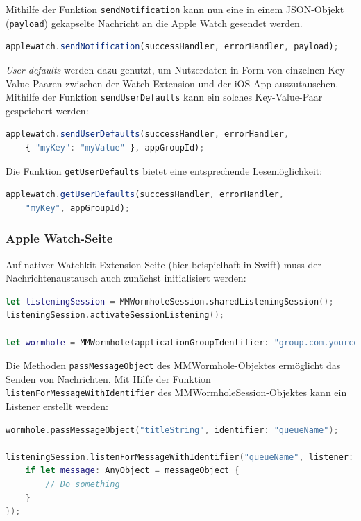 Mithilfe der Funktion \texttt{sendNotification} kann nun eine in einem JSON-Objekt (\texttt{payload}) gekapselte Nachricht an die Apple Watch gesendet werden.  
\begin{lstlisting}[language=JavaScript]
applewatch.sendNotification(successHandler, errorHandler, payload);
\end{lstlisting}

\emph{User defaults} werden dazu genutzt, um Nutzerdaten in Form von einzelnen Key-Value-Paaren zwischen der Watch-Extension und der iOS-App auszutauschen. Mithilfe der Funktion \texttt{sendUserDefaults} kann ein solches Key-Value-Paar gespeichert werden:
\begin{lstlisting}[language=JavaScript, breaklines=true]
applewatch.sendUserDefaults(successHandler, errorHandler, 
    { "myKey": "myValue" }, appGroupId);
\end{lstlisting}
Die Funktion \texttt{getUserDefaults} bietet eine entsprechende Lesemöglichkeit:
\begin{lstlisting}[language=JavaScript]
applewatch.getUserDefaults(successHandler, errorHandler, 
    "myKey", appGroupId);
\end{lstlisting}
%
%
\subsubsection{Apple Watch-Seite}
Auf nativer Watchkit Extension Seite (hier beispielhaft in Swift) muss der Nachrichtenaustausch auch zunächst initialisiert werden:
\begin{lstlisting}[language=swift, breaklines=true]
let listeningSession = MMWormholeSession.sharedListeningSession();
listeningSession.activateSessionListening();

let wormhole = MMWormhole(applicationGroupIdentifier: "group.com.yourcompany", optionalDirectory: nil, transitingType: .SessionContext);
\end{lstlisting}

Die Methoden \texttt{passMessageObject} des MMWormhole-Objektes ermöglicht das Senden von Nachrichten. Mit Hilfe der Funktion \texttt{listenForMessageWithIdentifier} des MMWormholeSession-Objektes kann ein Listener erstellt werden:
\begin{lstlisting}[language=swift, breaklines=true]
wormhole.passMessageObject("titleString", identifier: "queueName");

listeningSession.listenForMessageWithIdentifier("queueName", listener: { (messageObject) -> Void in
    if let message: AnyObject = messageObject {
        // Do something
    }
});
\end{lstlisting}

